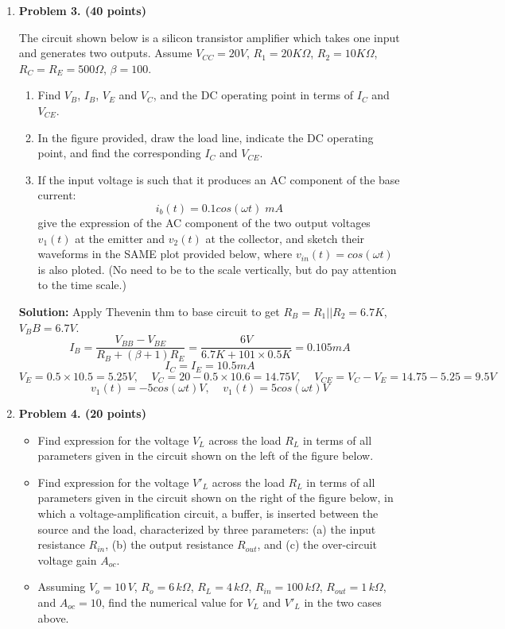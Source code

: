\begin{enumerate}
\item {\bf Problem 3. (40 points)} 


The circuit shown below is a silicon transistor amplifier which takes one
input and generates two outputs. Assume $V_{CC}=20V$, $R_1=20K\Omega$,
$R_2=10K\Omega$, $R_C=R_E=500\Omega$, $\beta=100$. 

\begin{enumerate}
\item Find $V_B$, $I_B$, $V_E$ and $V_C$, and the DC operating point in 
terms of $I_C$ and $V_{CE}$. 
\item In the figure provided, draw the load line, indicate the DC operating 
point, and find the corresponding $I_C$ and $V_{CE}$.
\item If the input voltage is such that it produces an AC component of the 
base current:
\[	i_b(t)=0.1 cos(\omega t) \; mA	\]
give the expression of the AC component of the two output voltages $v_1(t)$ 
at the emitter and $v_2(t)$ at the collector, and sketch their waveforms in 
the SAME plot provided below, where $v_{in}(t)=cos(\omega t)$ is also ploted.
(No need to be to the scale vertically, but do pay attention to the time
scale.)
\end{enumerate}


{\bf Solution:} 
Apply Thevenin thm to base circuit to get $R_B=R_1 || R_2=6.7K$, $V_BB=6.7V$.
\[ I_B=\frac{V_{BB}-V_{BE}}{R_B+(\beta+1)R_E}=\frac{6V}{6.7K+101\times 0.5K}
	=0.105 mA \]
\[ I_C=I_E=10.5 mA \]
\[ V_E=0.5\times 10.5=5.25V,\;\;\;\; V_C=20-0.5\times 10.6=14.75V,\;\;\;\;
	V_{CE}=V_C-V_E=14.75-5.25=9.5V \]
\[ v_1(t)=-5 cos(\omega t) V,\;\;\;\;v_1(t)=5 cos(\omega t) V	\]

\item {\bf Problem 4. (20 points)} 
  \begin{itemize}
  \item Find expression for the voltage $V_L$ across the load $R_L$ in terms 
    of all parameters given in the circuit shown on the left of the figure 
    below.
  \item Find expression for the voltage $V'_L$ across the load $R_L$ in terms 
    of all parameters given in the circuit shown on the right of the figure 
    below, in which a voltage-amplification circuit, a buffer, is inserted 
    between the source and the load, characterized by three parameters: 
    (a) the input resistance $R_{in}$, (b) the output resistance $R_{out}$, 
    and (c) the over-circuit voltage gain $A_{oc}$. 
  \item Assuming $V_o=10\,V$, $R_o=6\,k\Omega$, $R_L=4\,k\Omega$, 
    $R_{in}=100\,k\Omega$, $R_{out}=1\,k\Omega$, and $A_{oc}=10$, find the 
    numerical value for $V_L$ and $V'_L$ in the two cases above.
  \end{itemize}


\end{enumerate}
